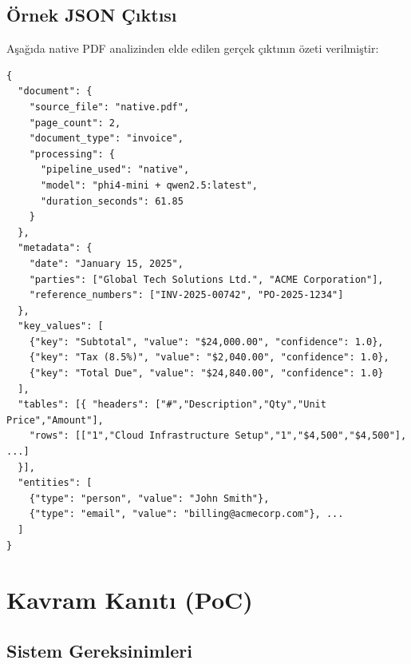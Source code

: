 \documentclass[11pt,a4paper]{article}
\begin{document}
\subsection{Örnek JSON Çıktısı}
Aşağıda native PDF analizinden elde edilen gerçek çıktının özeti verilmiştir:

\begin{lstlisting}[basicstyle=\ttfamily\scriptsize, frame=single, breaklines=true]
{
  "document": {
    "source_file": "native.pdf",
    "page_count": 2,
    "document_type": "invoice",
    "processing": {
      "pipeline_used": "native",
      "model": "phi4-mini + qwen2.5:latest",
      "duration_seconds": 61.85
    }
  },
  "metadata": {
    "date": "January 15, 2025",
    "parties": ["Global Tech Solutions Ltd.", "ACME Corporation"],
    "reference_numbers": ["INV-2025-00742", "PO-2025-1234"]
  },
  "key_values": [
    {"key": "Subtotal", "value": "$24,000.00", "confidence": 1.0},
    {"key": "Tax (8.5%)", "value": "$2,040.00", "confidence": 1.0},
    {"key": "Total Due", "value": "$24,840.00", "confidence": 1.0}
  ],
  "tables": [{ "headers": ["#","Description","Qty","Unit Price","Amount"],
    "rows": [["1","Cloud Infrastructure Setup","1","$4,500","$4,500"], ...]
  }],
  "entities": [
    {"type": "person", "value": "John Smith"},
    {"type": "email", "value": "billing@acmecorp.com"}, ...
  ]
}
\end{lstlisting}

\section{Kavram Kanıtı (PoC)}

\subsection{Sistem Gereksinimleri}

\begin{table}[H]
\centering
\caption{Minimum ve Önerilen Sistem Gereksinimleri}
\end{table}
\end{document}

